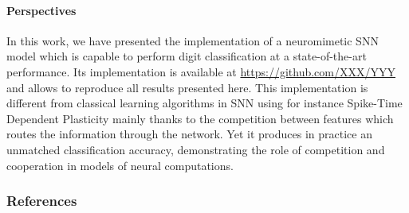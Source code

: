 \documentclass[12pt]{article}
\begin{document}
\paragraph*{Perspectives}
In this work, we have presented the implementation of a neuromimetic SNN model which is capable to perform digit classification at a state-of-the-art performance. Its implementation is available at \url{https://github.com/XXX/YYY} and allows to reproduce all results presented here. %
This implementation is different from classical learning algorithms in SNN using for instance Spike-Time Dependent Plasticity mainly thanks to the competition between features which routes the information through the network. Yet it produces in practice an unmatched classification accuracy, demonstrating the role of competition and cooperation in models of neural computations.
%


\subsubsection*{References}
  \vspace{-15pt}
{
\small
\begingroup
{}
\setlength\bibitemsep{1pt}
\printbibliography[heading=none]
\endgroup
}



\end{document}

